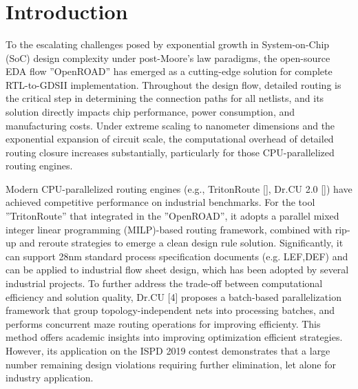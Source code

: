 \documentclass[sigconf]{acmart}
\begin{document}
\title{\Huge\bf }



\baselineskip=10.62pt   %


\begin{abstract}


\end{abstract}

\maketitle




\section{Introduction}\label{sec:introduction}

To the escalating challenges posed by exponential growth in System-on-Chip (SoC) design complexity under post-Moore's law paradigms, the open-source EDA flow ''OpenROAD'' has emerged as a cutting-edge solution for complete RTL-to-GDSII implementation.   Throughout the design flow, detailed routing is the critical step in determining the connection paths for all netlists, and its solution directly impacts chip performance, power consumption, and manufacturing costs. Under extreme scaling to nanometer dimensions and the exponential expansion of circuit scale, the computational overhead of detailed routing closure increases substantially, particularly for those CPU-parallelized routing engines.


Modern CPU-parallelized routing engines (e.g., TritonRoute [], Dr.CU 2.0 []) have achieved competitive performance on industrial benchmarks. For the tool ''TritonRoute'' that integrated in the ''OpenROAD'', it adopts a parallel mixed integer linear programming (MILP)-based routing framework, combined with rip-up and reroute strategies to emerge a clean design rule solution. Significantly, it can support 28nm standard process specification documents (e.g. LEF,DEF) and can be applied to industrial flow sheet design, which has been adopted by several industrial projects. To further address the trade-off between computational efficiency and solution quality, Dr.CU [4] proposes a batch-based parallelization framework that group topology-independent nets into processing batches, and performs concurrent maze routing operations for improving efficienty. This method offers academic insights into improving optimization efficient strategies. However, its application on the ISPD 2019 contest demonstrates that a large number remaining design violations requiring further elimination, let alone for industry application.
\end{document}

